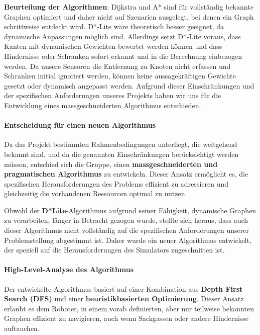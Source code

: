 \documentclass[main.tex]{subfiles} %
\begin{document}
\textbf{Beurteilung der Algorithmen}:  
Dijkstra und A* sind für vollständig bekannte Graphen optimiert und daher  
nicht auf Szenarien ausgelegt, bei denen ein Graph schrittweise entdeckt wird.  
D*-Lite wäre theoretisch besser geeignet, da dynamische Anpassungen möglich sind.  
Allerdings setzt D*-Lite voraus, dass Kanten mit dynamischen Gewichten bewertet  
werden können und dass Hindernisse oder Schranken sofort erkannt und in die  
Berechnung einbezogen werden. Da unsere Sensoren die Entfernung zu Knoten nicht  
erfassen und Schranken initial ignoriert werden, können keine aussagekräftigen  
Gewichte gesetzt oder dynamisch angepasst werden. Aufgrund dieser Einschränkungen  
und der spezifischen Anforderungen unseres Projekts haben wir uns für die  
Entwicklung eines massgeschneiderten Algorithmus entschieden.

\paragraph{Entscheidung für einen neuen Algorithmus}

Da das Projekt bestimmten Rahmenbedingungen unterliegt, die
weitgehend bekannt sind, und da die genannten Einschränkungen
berücksichtigt werden müssen, entschied sich die Gruppe, einen
\textbf{massgeschneiderten und pragmatischen Algorithmus} zu
entwickeln. Dieser Ansatz ermöglicht es, die spezifischen
Herausforderungen des Problems effizient zu adressieren und
gleichzeitig die vorhandenen Ressourcen optimal zu nutzen.

Obwohl der \textbf{D*Lite}-Algorithmus aufgrund seiner Fähigkeit,
dynamische Graphen zu verarbeiten, länger in Betracht gezogen wurde,
stellte sich heraus, dass auch dieser Algorithmus nicht vollständig
auf die spezifischen Anforderungen unserer Problemstellung abgestimmt
ist. Daher wurde ein neuer Algorithmus entwickelt, der speziell auf
die Herausforderungen des Simulators zugeschnitten ist.

\paragraph{High-Level-Analyse des Algorithmus}

Der entwickelte Algorithmus basiert auf einer Kombination aus
\textbf{Depth First Search (DFS)} und einer
\textbf{heuristikbasierten Optimierung}. Dieser Ansatz erlaubt es dem
Roboter, in einem vorab definierten, aber nur teilweise bekannten
Graphen effizient zu navigieren, auch wenn Sackgassen oder andere
Hindernisse auftauchen.
\end{document}
